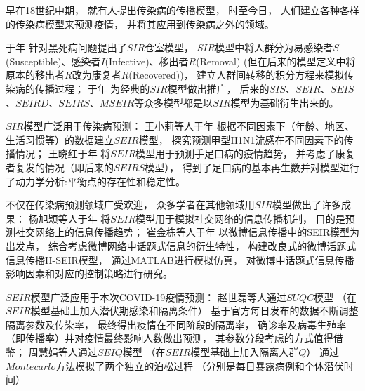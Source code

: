 \par 早在18世纪中期，
就有人提出传染病的传播模型，
时至今日，
人们建立各种各样的传染病模型来预测疫情，
并将其应用到传染病之外的领域。
\par \citeauthor{对流行病数学理论的贡献}于\citeyear{对流行病数学理论的贡献}年
针对黑死病问题提出了$SIR$仓室模型\cite{对流行病数学理论的贡献}，
$SIR$模型中将人群分为易感染者$S$(Susceptible)、感染者$I$(Infective)、移出者$R$(Removal)
(但在后来的模型定义中将原本的移出者$R$改为康复者$R$(Recovered))，
建立人群间转移的积分方程来模拟传染病的传播过程；
\citeauthor{Kermack-McKendrick确定性流行病模型的推广}于\citeyear{Kermack-McKendrick确定性流行病模型的推广}年
为经典的$SIR$模型做出推广\cite{Kermack-McKendrick确定性流行病模型的推广}，
后来的$SIS$、$SEIR$、$SEIS$、$SEIRD$、$SEIRS$、$MSEIR$等众多模型都是以$SIR$模型为基础衍生出来的。
\par $SIR$模型广泛用于传染病预测：
王小莉等人于\citeyear{应用SEIR模型预测2009年甲型H1N1流感流行趋势}年
根据不同因素下（年龄、地区、生活习惯等）的数据建立$SEIR$模型，
探究预测甲型H1N1流感在不同因素下的传播情况\cite{应用SEIR模型预测2009年甲型H1N1流感流行趋势}；
王晓红于\citeyear{一类具有潜伏期的SEIR手足口病模型的研究}年
将$SEIR$模型用于预测手足口病的疫情趋势\cite{一类具有潜伏期的SEIR手足口病模型的研究}，
并考虑了康复者复发的情况（即后来的$SEIRS$模型），
得到了足口病的基本再生数并对模型进行了动力学分析:平衡点的存在性和稳定性。
\par 不仅在传染病预测领域广受欢迎，
众多学者在其他领域用$SIR$模型做出了许多成果：
杨旭颖等人于\citeyear{基于SEIR的社交网络信息传播模型}年
将$SEIR$模型用于模拟社交网络的信息传播机制\cite{基于SEIR的社交网络信息传播模型}，
目的是预测社交网络上的信息传播趋势；
崔金栋等人于\citeyear{基于改良SEIR模型的微博话题式信息传播研究}年
以微博信息传播中的SEIR模型为出发点，
综合考虑微博网络中话题式信息的衍生特性，
构建改良式的微博话题式信息传播H-SEIR模型\cite{基于改良SEIR模型的微博话题式信息传播研究}，
通过MATLAB进行模拟仿真，
对微博中话题式信息传播影响因素和对应的控制策略进行研究。
\par $SEIR$模型广泛应用于本次COVID-19疫情预测：
赵世磊等人通过$SUQC$模型\cite{通过流行病学建模表征传播和确定COVID-19的控制策略}
（在$SEIR$模型基础上加入潜伏期感染和隔离条件）
基于官方每日发布的数据不断调整隔离参数及传染率，
最终得出疫情在不同阶段的隔离率，
确诊率及病毒生殖率（即传播率）并对疫情最终影响人数做出预测，
其参数分段考虑的方式值得借鉴；
周慧娟等人通过$SEIQ$模型\cite{中国COVID-19爆发的流行动力学模型和控制}
（在$SEIR$模型基础上加入隔离人群$Q$）
通过$Montecarlo$方法模拟了两个独立的泊松过程
（分别是每日暴露病例和个体潜伏时间）
